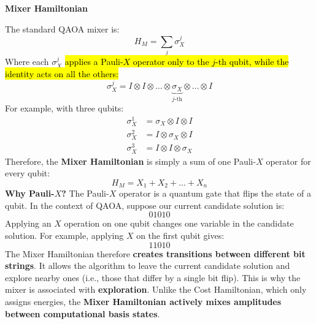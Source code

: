 \highspace
\begin{flushleft}
    \textcolor{Green3}{ \textbf{Mixer Hamiltonian}}
\end{flushleft}
The standard QAOA mixer is:
\begin{equation}
    H_M = \sum_j \sigma_{X}^{j}
\end{equation}
Where each $\sigma_{X}^{j}$ \hl{applies a Pauli-$X$ operator only to the $j$-th qubit, while the identity acts on all the others:}
\begin{equation*}
    \sigma_{X}^{j} = I \otimes I \otimes \dots \otimes \underbrace{\sigma_{X}}_{j\text{-th}} \otimes \dots \otimes I
\end{equation*}
For example, with three qubits:
\begin{equation*}
    \begin{aligned}
        \sigma_{X}^{1} &= \sigma_{X} \otimes I \otimes I \\
        \sigma_{X}^{2} &= I \otimes \sigma_{X} \otimes I \\
        \sigma_{X}^{3} &= I \otimes I \otimes \sigma_{X}
    \end{aligned}
\end{equation*}
Therefore, the \textbf{Mixer Hamiltonian} is simply a sum of one Pauli-$X$ operator for every qubit:
\begin{equation*}
    H_M = X_1 + X_2 + \dots + X_n
\end{equation*}
\textcolor{Green3}{ \textbf{Why Pauli-$X$?}} The Pauli-$X$ operator is a quantum gate that flips the state of a qubit. In the context of QAOA, suppose our current candidate solution is:
\begin{equation*}
    01010
\end{equation*}
Applying an $X$ operation on one qubit changes one variable in the candidate solution. For example, applying $X$ on the first qubit gives:
\begin{equation*}
    11010
\end{equation*}
The Mixer Hamiltonian therefore \textbf{creates transitions between different bit strings}. It allows the algorithm to leave the current candidate solution and explore nearby ones (i.e., those that differ by a single bit flip). This is why the mixer is associated with \textbf{exploration}. Unlike the Cost Hamiltonian, which only assigns energies, the \textbf{Mixer Hamiltonian actively mixes amplitudes between computational basis states}.


